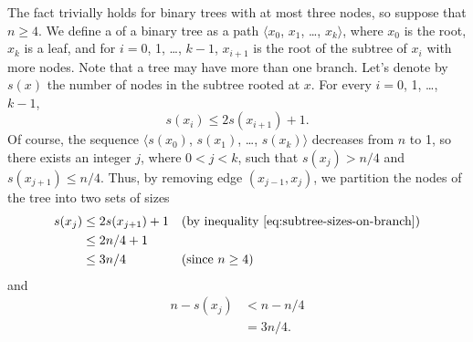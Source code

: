 The fact trivially holds for binary trees with at most three nodes, so suppose that $n\ge4$.
We define a  of a binary tree as a path $\langle x_0$, $x_1$, \dots, $x_k\rangle$, where $x_0$ is the root, $x_k$ is a leaf, and for $i=0$, 1, \dots, $k-1$, $x_{i+1}$ is the root of the subtree of $x_i$ with more nodes.
Note that a tree may have more than one branch.
Let's denote by $s(x)$ the number of nodes in the subtree rooted at $x$.
For every $i=0$, 1, \dots, $k-1$,
\begin{equation} \label{eq:subtree-sizes-on-branch}
    s(x_i) \le 2s(x_{i+1})+1.
\end{equation}
Of course, the sequence $\langle s(x_0)$, $s(x_1)$, \dots, $s(x_k)\rangle$ decreases from $n$ to 1, so there exists an integer $j$, where $0<j<k$, such that $s(x_j)>n/4$ and $s(x_{j+1})\le n/4$.
Thus, by removing edge $(x_{j-1},x_j)$, we partition the nodes of the tree into two sets of sizes
\begin{align*}
    s(x_j) &\le 2s(x_{j+1})+1 && \text{(by inequality \eqref{eq:subtree-sizes-on-branch})} \\
    &\le 2n/4+1 \\
    &\le 3n/4 && \text{(since $n\ge4$)}
\end{align*}
and
\begin{align*}
    n-s(x_j) &< n-n/4 \\
    &= 3n/4.
\end{align*}
